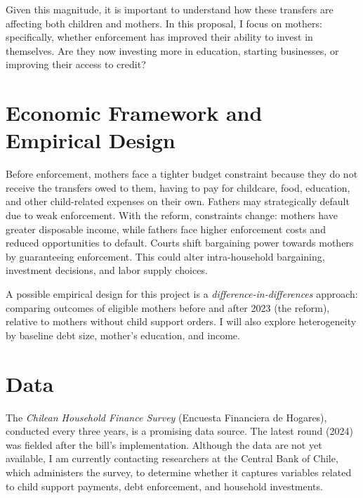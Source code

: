 Given this magnitude, it is important to understand how these transfers are affecting both children and mothers. In this proposal, I focus on mothers: specifically, whether enforcement has improved their ability to invest in themselves. Are they now investing more in education, starting businesses, or improving their access to credit?

\section{Economic Framework and Empirical Design}
Before enforcement, mothers face a tighter budget constraint because they do not receive the transfers owed to them, having to pay for childcare, food, education, and other child-related expenses on their own. Fathers may strategically default due to weak enforcement. With the reform, constraints change: mothers have greater disposable income, while fathers face higher enforcement costs and reduced opportunities to default. Courts shift bargaining power towards mothers by guaranteeing enforcement. This could alter intra-household bargaining, investment decisions, and labor supply choices.

A possible empirical design for this project is a \textit{difference-in-differences} approach: comparing outcomes of eligible mothers before and after 2023 (the reform), relative to mothers without child support orders. I will also explore heterogeneity by baseline debt size, mother’s education, and income.

\section{Data}
The \textit{Chilean Household Finance Survey} (Encuesta Financiera de Hogares), conducted every three years, is a promising data source. The latest round (2024) was fielded after the bill’s implementation. Although the data are not yet available, I am currently contacting researchers at the Central Bank of Chile, which administers the survey, to determine whether it captures variables related to child support payments, debt enforcement, and household investments.





